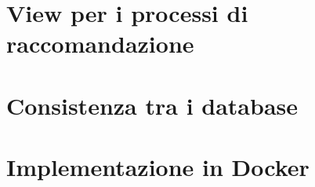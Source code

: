 \section*{View per i processi di raccomandazione}

\section*{Consistenza tra i database}

\section*{Implementazione in Docker}

